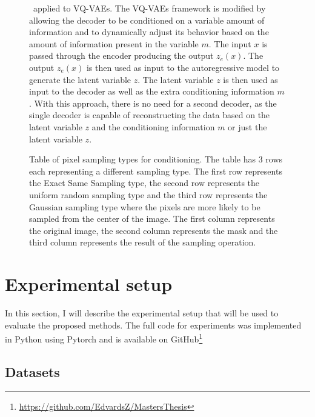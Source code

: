 \begin{figure}[H]
    \centering
    
    \caption[ applied to VQ-VAEs.]%
    {
        \methodTwo\ applied to VQ-VAEs. The VQ-VAEs framework is modified by allowing the decoder to be conditioned on a variable amount of information and to dynamically adjust its behavior based on the amount of information present in the variable $m$. The input $x$ is passed through the encoder producing the output $z_e(x)$. The output $z_e(x)$ is then used as input to the autoregressive model to generate the latent variable $z$. The latent variable $z$ is then used as input to the decoder as well as the extra conditioning information $m$. With this approach, there is no need for a second decoder, as the single decoder is capable of reconstructing the data based on the latent variable $z$ and the conditioning information $m$ or just the latent variable $z$.
    }\label{SCVQVAE1DFigure}
\end{figure}

\begin{figure}
    \centering
    
    \caption[Table of pixel sampling types for conditioning.]%
    {
        Table of pixel sampling types for conditioning. The table has 3 rows each representing a different sampling type. The first row represents the Exact Same Sampling type, the second row represents the uniform random sampling type and the third row represents the Gaussian sampling type where the pixels are more likely to be sampled from the center of the image. The first column represents the original image, the second column represents the mask and the third column represents the result of the sampling operation.
    }\label{SamplingFigure}
\end{figure}

\section{Experimental setup}

In this section, I will describe the experimental setup that will be used to evaluate the proposed methods. The full code for experiments was implemented in Python using Pytorch and is available on GitHub\footnote{\url{https://github.com/EdvardsZ/MastersThesis}}

\subsection{Datasets}

